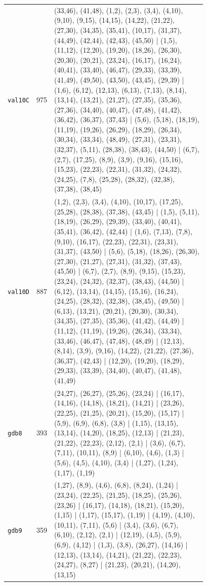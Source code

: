 \begin{landscape}
\begin{longtable}{lr>{\tiny\raggedright\arraybackslash}p{0.78\linewidth}}
\texttt{val10C} & 975 & (33,46), (41,48), (1,2), (2,3), (3,4), (4,10), (9,10), (9,15), (14,15), (14,22), (21,22), (27,30), (34,35), (35,41), (10,17), (31,37), (44,49), (42,44), (42,43), (45,50) | (1,5), (11,12), (12,20), (19,20), (18,26), (26,30), (20,30), (20,21), (23,24), (16,17), (16,24), (40,41), (33,40), (46,47), (29,33), (33,39), (41,49), (49,50), (43,50), (43,45), (29,39) | (1,6), (6,12), (12,13), (6,13), (7,13), (8,14), (13,14), (13,21), (21,27), (27,35), (35,36), (27,36), (34,40), (40,47), (47,48), (41,42), (36,42), (36,37), (37,43) | (5,6), (5,18), (18,19), (11,19), (19,26), (26,29), (18,29), (26,34), (30,34), (33,34), (48,49), (27,31), (23,31), (32,37), (5,11), (28,38), (38,43), (44,50) | (6,7), (2,7), (17,25), (8,9), (3,9), (9,16), (15,16), (15,23), (22,23), (22,31), (31,32), (24,32), (24,25), (7,8), (25,28), (28,32), (32,38), (37,38), (38,45) \\[2pt]
\texttt{val10D} & 887 & (1,2), (2,3), (3,4), (4,10), (10,17), (17,25), (25,28), (28,38), (37,38), (43,45) | (1,5), (5,11), (18,19), (26,29), (29,39), (33,40), (40,41), (35,41), (36,42), (42,44) | (1,6), (7,13), (7,8), (9,10), (16,17), (22,23), (22,31), (23,31), (31,37), (43,50) | (5,6), (5,18), (18,26), (26,30), (27,30), (21,27), (27,31), (31,32), (37,43), (45,50) | (6,7), (2,7), (8,9), (9,15), (15,23), (23,24), (24,32), (32,37), (38,43), (44,50) | (6,12), (13,14), (14,15), (15,16), (16,24), (24,25), (28,32), (32,38), (38,45), (49,50) | (6,13), (13,21), (20,21), (20,30), (30,34), (34,35), (27,35), (35,36), (41,42), (44,49) | (11,12), (11,19), (19,26), (26,34), (33,34), (33,46), (46,47), (47,48), (48,49) | (12,13), (8,14), (3,9), (9,16), (14,22), (21,22), (27,36), (36,37), (42,43) | (12,20), (19,20), (18,29), (29,33), (33,39), (34,40), (40,47), (41,48), (41,49) \\[2pt]
\texttt{gdb8} & 393 & (24,27), (26,27), (25,26), (23,24) | (16,17), (14,16), (14,18), (18,21), (14,21) | (23,26), (22,25), (21,25), (20,21), (15,20), (15,17) | (5,9), (6,9), (6,8), (3,8) | (1,15), (13,15), (13,14), (14,20), (18,25), (12,13) | (21,23), (21,22), (22,23), (2,12), (2,1) | (3,6), (6,7), (7,11), (10,11), (8,9) | (6,10), (4,6), (1,3) | (5,6), (4,5), (4,10), (3,4) | (1,27), (1,24), (1,17), (1,19) \\[2pt]
\texttt{gdb9} & 359 & (1,27), (8,9), (4,6), (6,8), (8,24), (1,24) | (23,24), (22,25), (21,25), (18,25), (25,26), (23,26) | (16,17), (14,18), (18,21), (15,20), (1,15) | (1,17), (15,17), (1,19) | (4,19), (4,10), (10,11), (7,11), (5,6) | (3,4), (3,6), (6,7), (6,10), (2,12), (2,1) | (12,19), (4,5), (5,9), (6,9), (4,12) | (1,3), (3,8), (26,27), (14,16) | (12,13), (13,14), (14,21), (21,22), (22,23), (24,27), (8,27) | (21,23), (20,21), (14,20), (13,15) \\[2pt]

\end{longtable}
\end{landscape}
